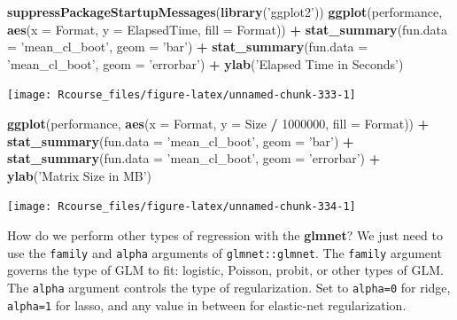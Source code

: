 \documentclass[]{book}
\newenvironment{Shaded}{\begin{snugshade}}{\end{snugshade}}
\newcommand{\DataTypeTok}[1]{\textcolor[rgb]{0.13,0.29,0.53}{#1}}
\newcommand{\DecValTok}[1]{\textcolor[rgb]{0.00,0.00,0.81}{#1}}
\newcommand{\KeywordTok}[1]{\textcolor[rgb]{0.13,0.29,0.53}{\textbf{#1}}}
\newcommand{\NormalTok}[1]{#1}
\newcommand{\OperatorTok}[1]{\textcolor[rgb]{0.81,0.36,0.00}{\textbf{#1}}}
\newcommand{\StringTok}[1]{\textcolor[rgb]{0.31,0.60,0.02}{#1}}
\theoremstyle{definition}
\theoremstyle{definition}
\theoremstyle{definition}
\theoremstyle{remark}
\begin{document}
\begin{Shaded}
\begin{Highlighting}[]
\KeywordTok{suppressPackageStartupMessages}\NormalTok{(}\KeywordTok{library}\NormalTok{(}\StringTok{'ggplot2'}\NormalTok{))}
\KeywordTok{ggplot}\NormalTok{(performance, }\KeywordTok{aes}\NormalTok{(}\DataTypeTok{x =}\NormalTok{ Format, }\DataTypeTok{y =}\NormalTok{ ElapsedTime, }\DataTypeTok{fill =}\NormalTok{ Format)) }\OperatorTok{+}
\StringTok{  }\KeywordTok{stat_summary}\NormalTok{(}\DataTypeTok{fun.data =} \StringTok{'mean_cl_boot'}\NormalTok{, }\DataTypeTok{geom =} \StringTok{'bar'}\NormalTok{) }\OperatorTok{+}
\StringTok{  }\KeywordTok{stat_summary}\NormalTok{(}\DataTypeTok{fun.data =} \StringTok{'mean_cl_boot'}\NormalTok{, }\DataTypeTok{geom =} \StringTok{'errorbar'}\NormalTok{) }\OperatorTok{+}
\StringTok{  }\KeywordTok{ylab}\NormalTok{(}\StringTok{'Elapsed Time in Seconds'}\NormalTok{) }
\end{Highlighting}
\end{Shaded}

\texttt{[image: Rcourse\_files/figure-latex/unnamed-chunk-333-1]}

\begin{Shaded}
\begin{Highlighting}[]
\KeywordTok{ggplot}\NormalTok{(performance, }\KeywordTok{aes}\NormalTok{(}\DataTypeTok{x =}\NormalTok{ Format, }\DataTypeTok{y =}\NormalTok{ Size }\OperatorTok{/}\StringTok{ }\DecValTok{1000000}\NormalTok{, }\DataTypeTok{fill =}\NormalTok{ Format)) }\OperatorTok{+}
\StringTok{  }\KeywordTok{stat_summary}\NormalTok{(}\DataTypeTok{fun.data =} \StringTok{'mean_cl_boot'}\NormalTok{, }\DataTypeTok{geom =} \StringTok{'bar'}\NormalTok{) }\OperatorTok{+}
\StringTok{  }\KeywordTok{stat_summary}\NormalTok{(}\DataTypeTok{fun.data =} \StringTok{'mean_cl_boot'}\NormalTok{, }\DataTypeTok{geom =} \StringTok{'errorbar'}\NormalTok{) }\OperatorTok{+}
\StringTok{  }\KeywordTok{ylab}\NormalTok{(}\StringTok{'Matrix Size in MB'}\NormalTok{) }
\end{Highlighting}
\end{Shaded}

\texttt{[image: Rcourse\_files/figure-latex/unnamed-chunk-334-1]}

How do we perform other types of regression with the \textbf{glmnet}?
We just need to use the \texttt{family} and \texttt{alpha} arguments of \texttt{glmnet::glmnet}.
The \texttt{family} argument governs the type of GLM to fit: logistic, Poisson, probit, or other types of GLM.
The \texttt{alpha} argument controls the type of regularization. Set to \texttt{alpha=0} for ridge, \texttt{alpha=1} for lasso, and any value in between for elastic-net regularization.
\end{document}

